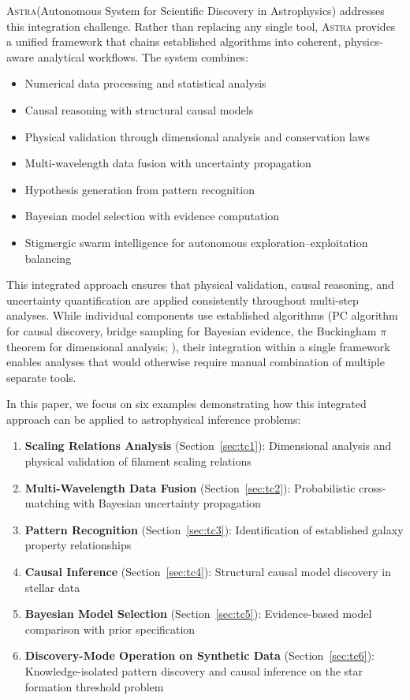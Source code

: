 \documentclass[usenatbib]{rasti}
\newcommand{\astra}{\textsc{Astra}\xspace}
\newcommand{\pc}{PC\xspace}
\begin{document}
\astra (Autonomous System for Scientific Discovery in Astrophysics) addresses this integration challenge.
Rather than replacing any single tool, \astra provides a unified framework that chains established algorithms into coherent, physics-aware analytical workflows.
The system combines:
\begin{itemize}
  \item Numerical data processing and statistical analysis
  \item Causal reasoning with structural causal models
  \item Physical validation through dimensional analysis and conservation laws
  \item Multi-wavelength data fusion with uncertainty propagation
  \item Hypothesis generation from pattern recognition
  \item Bayesian model selection with evidence computation
  \item Stigmergic swarm intelligence for autonomous exploration--exploitation balancing
\end{itemize}

This integrated approach ensures that physical validation, causal reasoning, and uncertainty quantification are applied consistently throughout multi-step analyses.
While individual components use established algorithms (\pc algorithm for causal discovery, bridge sampling for Bayesian evidence, the Buckingham $\pi$ theorem for dimensional analysis; \citealt{Buckingham1914}), their integration within a single framework enables analyses that would otherwise require manual combination of multiple separate tools.

In this paper, we focus on six examples demonstrating how this integrated approach can be applied to astrophysical inference problems:
\begin{enumerate}
  \item[(i)] \textbf{Scaling Relations Analysis} (Section~\ref{sec:tc1}): Dimensional analysis and physical validation of filament scaling relations
  \item[(ii)] \textbf{Multi-Wavelength Data Fusion} (Section~\ref{sec:tc2}): Probabilistic cross-matching with Bayesian uncertainty propagation
  \item[(iii)] \textbf{Pattern Recognition} (Section~\ref{sec:tc3}): Identification of established galaxy property relationships
  \item[(iv)] \textbf{Causal Inference} (Section~\ref{sec:tc4}): Structural causal model discovery in stellar data
  \item[(v)] \textbf{Bayesian Model Selection} (Section~\ref{sec:tc5}): Evidence-based model comparison with prior specification
  \item[(vi)] \textbf{Discovery-Mode Operation on Synthetic Data} (Section~\ref{sec:tc6}): Knowledge-isolated pattern discovery and causal inference on the star formation threshold problem
\end{enumerate}
\end{document}

